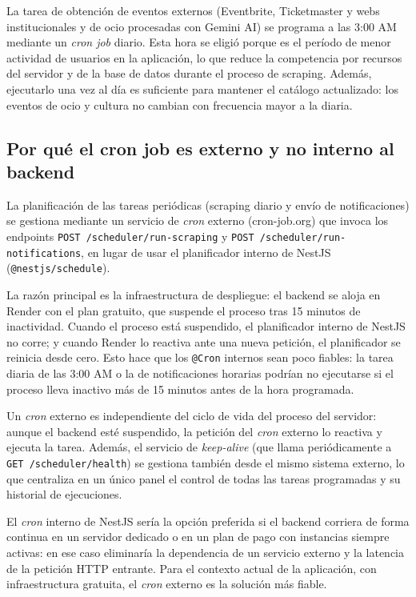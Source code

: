 La tarea de obtención de eventos externos (Eventbrite, Ticketmaster y webs institucionales y de ocio procesadas con Gemini AI) se programa a las 3:00 AM mediante un \textit{cron job} diario. Esta hora se eligió porque es el período de menor actividad de usuarios en la aplicación, lo que reduce la competencia por recursos del servidor y de la base de datos durante el proceso de scraping. Además, ejecutarlo una vez al día es suficiente para mantener el catálogo actualizado: los eventos de ocio y cultura no cambian con frecuencia mayor a la diaria.

\subsection{Por qué el cron job es externo y no interno al backend}

La planificación de las tareas periódicas (scraping diario y envío de notificaciones) se gestiona mediante un servicio de \textit{cron} externo (cron-job.org) que invoca los endpoints \texttt{POST /scheduler/run-scraping} y \texttt{POST /scheduler/run-notifications}, en lugar de usar el planificador interno de NestJS (\texttt{@nestjs/schedule}).

La razón principal es la infraestructura de despliegue: el backend se aloja en Render con el plan gratuito, que suspende el proceso tras 15 minutos de inactividad. Cuando el proceso está suspendido, el planificador interno de NestJS no corre; y cuando Render lo reactiva ante una nueva petición, el planificador se reinicia desde cero. Esto hace que los \texttt{@Cron} internos sean poco fiables: la tarea diaria de las 3:00 AM o la de notificaciones horarias podrían no ejecutarse si el proceso lleva inactivo más de 15 minutos antes de la hora programada.

Un \textit{cron} externo es independiente del ciclo de vida del proceso del servidor: aunque el backend esté suspendido, la petición del \textit{cron} externo lo reactiva y ejecuta la tarea. Además, el servicio de \textit{keep-alive} (que llama periódicamente a \texttt{GET /scheduler/health}) se gestiona también desde el mismo sistema externo, lo que centraliza en un único panel el control de todas las tareas programadas y su historial de ejecuciones.

El \textit{cron} interno de NestJS sería la opción preferida si el backend corriera de forma continua en un servidor dedicado o en un plan de pago con instancias siempre activas: en ese caso eliminaría la dependencia de un servicio externo y la latencia de la petición HTTP entrante. Para el contexto actual de la aplicación, con infraestructura gratuita, el \textit{cron} externo es la solución más fiable.

